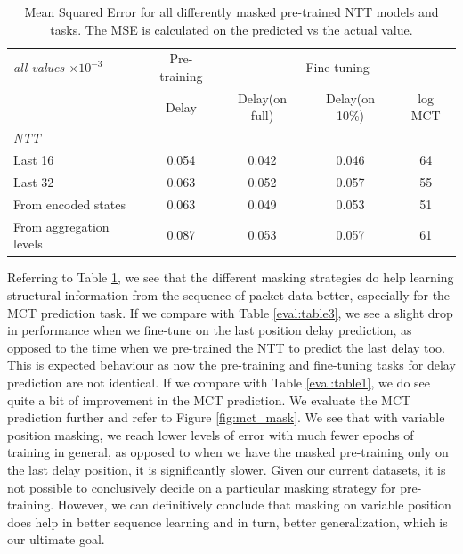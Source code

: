 \begin{table}[htbp]
\centering
\begin{tabular}{ l   c   c  c  c}
\toprule
\emph{all values $\times10^{-3}$} & Pre-training  & \multicolumn{3}{c}{Fine-tuning} \\
\cmidrule{3-5}
                                                       & {Delay}        & {Delay(on full)}  & {Delay(on 10\%)}                           & {log MCT} \\
\midrule
\em{NTT}                                              & 		 &			  & 						   &          \\
    \smallindent Last 16                                &    0.054            &  0.042  &        0.046                        &    64        \\
    \smallindent Last 32                                & 0.063         & 0.052                   &        0.057  		   &  55        \\
     \smallindent From encoded states        & 0.063          & 0.049              &   0.053             	  &   51        \\
     \smallindent From aggregation levels     & 0.087          & 0.053              &  0.057              & 61       \\

     \bottomrule

\end{tabular}
\caption{Mean Squared Error for all differently masked pre-trained NTT models and tasks. The MSE is calculated on the predicted vs the actual value.}
\label{eval:table4}
\end{table}

Referring to Table \ref{eval:table4}, we see that the different masking strategies do help learning structural information from the sequence of packet data better, especially for the MCT prediction task. If we compare with Table \ref{eval:table3}, we see a slight drop in performance when we fine-tune on the last position delay prediction, as opposed to the time when we pre-trained the NTT to predict the last delay too. This is expected behaviour as now the pre-training and fine-tuning tasks for delay prediction are not identical. If we compare with Table \ref{eval:table1}, we do see quite a bit of improvement in the MCT prediction. We evaluate the MCT prediction further and refer to Figure \ref{fig:mct_mask}. We see that with variable position masking, we reach lower levels of error with much fewer epochs of training in general, as opposed to when we have the masked pre-training only on the last delay position, it is significantly slower. Given our current datasets, it is not possible to conclusively decide on a particular masking strategy for pre-training. However, we can definitively conclude that masking on variable position does help in better sequence learning and in turn, better generalization, which is our ultimate goal.

